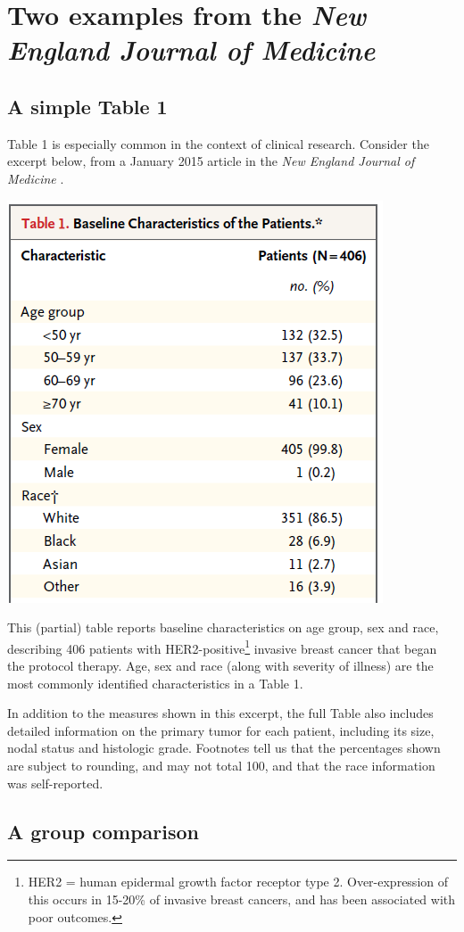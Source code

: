 \documentclass[]{book}
\let\rmarkdownfootnote\footnote%
\def\footnote{\protect\rmarkdownfootnote}
\theoremstyle{definition}
\theoremstyle{definition}
\theoremstyle{definition}
\theoremstyle{remark}
\begin{document}
\section{\texorpdfstring{Two examples from the \emph{New England Journal
of
Medicine}}{Two examples from the New England Journal of Medicine}}\label{two-examples-from-the-new-england-journal-of-medicine}

\subsection{A simple Table 1}\label{a-simple-table-1}

Table 1 is especially common in the context of clinical research.
Consider the excerpt below, from a January 2015 article in the \emph{New
England Journal of Medicine} \citep{Tolaney2015}.

\includegraphics[width=0.5\linewidth]{images/Tolaney-snip1}

This (partial) table reports baseline characteristics on age group, sex
and race, describing 406 patients with HER2-positive\footnote{HER2 =
  human epidermal growth factor receptor type 2. Over-expression of this
  occurs in 15-20\% of invasive breast cancers, and has been associated
  with poor outcomes.} invasive breast cancer that began the protocol
therapy. Age, sex and race (along with severity of illness) are the most
commonly identified characteristics in a Table 1.

In addition to the measures shown in this excerpt, the full Table also
includes detailed information on the primary tumor for each patient,
including its size, nodal status and histologic grade. Footnotes tell us
that the percentages shown are subject to rounding, and may not total
100, and that the race information was self-reported.

\subsection{A group comparison}\label{a-group-comparison}
\end{document}
